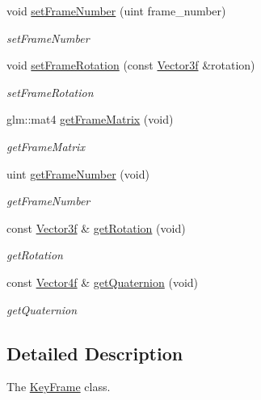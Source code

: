 \begin{DoxyCompactItemize}
\item 
void \hyperlink{classEngine_1_1KeyFrame_a7b764a7547fbaa218fc197d18b1aba8f}{set\+Frame\+Number} (uint frame\+\_\+number)
\begin{DoxyCompactList}\small\item\em set\+Frame\+Number \end{DoxyCompactList}\item 
void \hyperlink{classEngine_1_1KeyFrame_ab87c6910ea2a357d1982a76ac2fcbf3f}{set\+Frame\+Rotation} (const \hyperlink{classVector3}{Vector3f} \&rotation)
\begin{DoxyCompactList}\small\item\em set\+Frame\+Rotation \end{DoxyCompactList}\item 
glm\+::mat4 \hyperlink{classEngine_1_1KeyFrame_aeaff889e7be8b52c518d363f95a89e22}{get\+Frame\+Matrix} (void)
\begin{DoxyCompactList}\small\item\em get\+Frame\+Matrix \end{DoxyCompactList}\item 
uint \hyperlink{classEngine_1_1KeyFrame_aa7d3c3d95ab648fe71318e024c862206}{get\+Frame\+Number} (void)
\begin{DoxyCompactList}\small\item\em get\+Frame\+Number \end{DoxyCompactList}\item 
const \hyperlink{classVector3}{Vector3f} \& \hyperlink{classEngine_1_1KeyFrame_a27630c2f7bf8f6a2194ed72618070993}{get\+Rotation} (void)
\begin{DoxyCompactList}\small\item\em get\+Rotation \end{DoxyCompactList}\item 
const \hyperlink{classVector4}{Vector4f} \& \hyperlink{classEngine_1_1KeyFrame_ae6b2df9cf54c3dbae7a793d4a67daf09}{get\+Quaternion} (void)
\begin{DoxyCompactList}\small\item\em get\+Quaternion \end{DoxyCompactList}\end{DoxyCompactItemize}


\subsection{Detailed Description}
The \hyperlink{classEngine_1_1KeyFrame}{Key\+Frame} class. 

